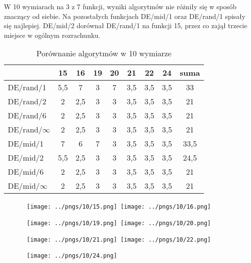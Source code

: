 W 10 wymiarach na 3 z 7 funkcji, wyniki algorytmów nie różniły się w sposób znaczący od siebie.
Na pozostałych funkcjach DE/mid/1 oraz DE/rand/1 spisały się najlepiej. DE/mid/2 dorównał DE/rand/1
na funkcji 15, przez co zajął trzecie miejsce w ogólnym rozrachunku. 

\begin{table}[H]
\centering
\begin{tabular}{ l | c | c | c | c | c | c | c | c}
                 & 15  & 16  & 19  & 20  & 21  & 22  & 24  & suma \\ \hline
DE/rand/1        & 5,5 & 7   & 3   & 7   & 3,5 & 3,5 & 3,5 & 33   \\ 
DE/rand/2        & 2   & 2,5 & 3   & 3   & 3,5 & 3,5 & 3,5 & 21   \\ 
DE/rand/6        & 2   & 2,5 & 3   & 3   & 3,5 & 3,5 & 3,5 & 21   \\ 
DE/rand/$\infty$ & 2   & 2,5 & 3   & 3   & 3,5 & 3,5 & 3,5 & 21   \\ 
DE/mid/1         & 7   & 6   & 7   & 3   & 3,5 & 3,5 & 3,5 & 33,5 \\
DE/mid/2         & 5,5 & 2,5 & 3   & 3   & 3,5 & 3,5 & 3,5 & 24,5 \\
DE/mid/6         & 2   & 2,5 & 3   & 3   & 3,5 & 3,5 & 3,5 & 21   \\ 
DE/mid/$\infty$  & 2   & 2,5 & 3   & 3   & 3,5 & 3,5 & 3,5 & 21   \\
\end{tabular}
\caption{Porównanie algorytmów w 10 wymiarze}
\label{table:10d}
\end{table}

\begin{figure}[H]
\centering
\mbox{
\texttt{[image: ../pngs/10/15.png]} \quad
\texttt{[image: ../pngs/10/16.png]} 
}
\end{figure}

\begin{figure}[H]
\centering
\mbox{
\texttt{[image: ../pngs/10/19.png]} \quad
\texttt{[image: ../pngs/10/20.png]} 
}
\end{figure}

\begin{figure}[H]
\centering
\mbox{
\texttt{[image: ../pngs/10/21.png]} \quad
\texttt{[image: ../pngs/10/22.png]} 
}
\end{figure}

\begin{figure}[H]
\centering
\mbox{
\texttt{[image: ../pngs/10/24.png]}
}
\end{figure}

